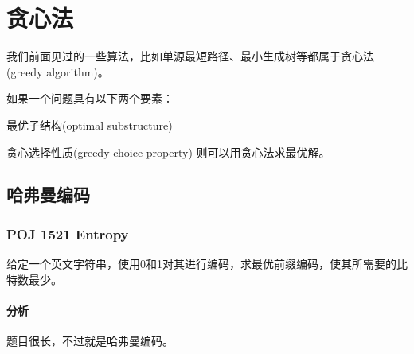 \chapter{贪心法}
我们前面见过的一些算法，比如单源最短路径、最小生成树等都属于贪心法(greedy algorithm)。

如果一个问题具有以下两个要素：
\begindot
\item 最优子结构(optimal substructure)
\item 贪心选择性质(greedy-choice property)
\myenddot
则可以用贪心法求最优解。

\section{哈弗曼编码} %

\subsection{POJ 1521 Entropy}
给定一个英文字符串，使用0和1对其进行编码，求最优前缀编码，使其所需要的比特数最少。

\subsubsection{分析}
题目很长，不过就是哈弗曼编码。


